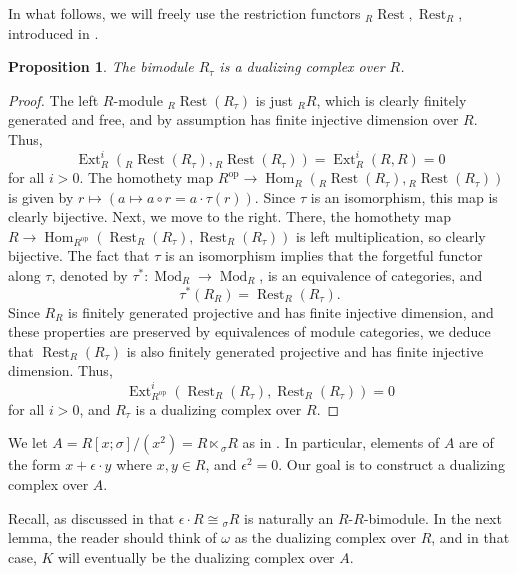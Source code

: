 \documentclass{amsart}
\newtheorem{prop}[equation]{Proposition}
\theoremstyle{definition}
\newcommand{\opn}{\operatorname}
\def\skewtimes{\ltimes\!}
\newcommand{\restl}{{}_R \opn{Rest}}
\newcommand{\restr}{\opn{Rest}_R}
\numberwithin{equation}{section}
\begin{document}
In what follows, we will freely use the restriction functors $\restl, \restr$, introduced in .

\begin{prop}\label{prop:rtaudualizing}
The bimodule $R_{\tau}$ is a dualizing complex over $R$.    
\end{prop}
\begin{proof}
The left $R$-module $\restl(R_{\tau})$ is just ${}_R R$,
which is clearly finitely generated and free,
and by assumption has finite injective dimension over $R$.
Thus, 
\[
\opn{Ext}^i_R(\restl(R_{\tau}),\restl(R_{\tau})) = \opn{Ext}^i_R(R,R) = 0
\]
for all $i>0$.
The homothety map $R^{\opn{op}} \to \opn{Hom}_R(\restl(R_{\tau}),\restl(R_{\tau}))$ is given by
$r \mapsto (a \mapsto a\circ r = a\cdot \tau(r))$.
Since $\tau$ is an isomorphism, this map is clearly bijective.
Next, we move to the right.
There, the homothety map $R \to \opn{Hom}_{R^{\opn{op}}}(\restr(R_{\tau}),\restr(R_{\tau}))$ is left multiplication, so clearly bijective.
The fact that $\tau$ is an isomorphism implies that the forgetful functor along $\tau$, denoted by
$\tau^*:\opn{Mod}_R \to \opn{Mod}_R$, is an equivalence of categories,
and 
\[
\tau^*(R_R) = \restr(R_{\tau}).
\]
Since $R_R$ is finitely generated projective and has finite injective dimension, and these properties are preserved by equivalences of module categories, we deduce that $\restr(R_{\tau})$ is also finitely generated projective and has finite injective dimension.
Thus, 
\[
\opn{Ext}^i_{R^{\opn{op}}}(\restr(R_{\tau}),\restr(R_{\tau})) = 0
\]
for all $i>0$, and $R_{\tau}$ is a dualizing complex over $R$.
\end{proof}

We let $A = R[x;\sigma]/(x^2) = R \skewtimes {}_{\sigma} R$ as in .
In particular, elements of $A$ are of the form $x+\epsilon\cdot y$ where $x,y \in R$, 
and $\epsilon^2 = 0$.
Our goal is to construct a dualizing complex over $A$.

Recall, as discussed in  that $\epsilon \cdot R \cong {}_{\sigma} R$ is naturally an $R$-$R$-bimodule. 
In the next lemma, the reader should think of $\omega$ as the dualizing complex over $R$,
and in that case, $K$ will eventually be the dualizing complex over $A$.
\end{document}
